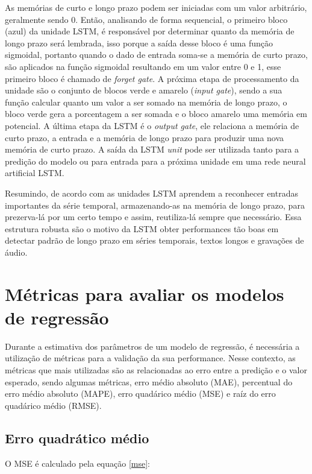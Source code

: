 \documentclass[
  12pt,		%
  a4paper,	%
  openright,%
  oneside,	%
  chapter=TITLE,		%
  section=TITLE,		%
  english,	%
  french,	%
  spanish,	%
  brazil	%
]{abntex2}
\begin{document}
    As memórias de curto e longo prazo podem ser iniciadas com um valor arbitrário, geralmente sendo 0. Então, analisando
    de forma sequencial, o primeiro bloco (azul) da unidade LSTM, é responsável por determinar quanto da memória de longo prazo será lembrada,
    isso porque a saída desse bloco é uma função sigmoidal, portanto quando o dado de entrada soma-se a memória de curto prazo, são aplicados
    na função sigmoidal resultando em um valor entre 0 e 1, esse primeiro bloco é chamado de \textit{forget gate}.
    A próxima etapa de processamento da unidade são o conjunto de blocos verde e amarelo (\textit{input gate}), sendo a sua função calcular 
    quanto um valor a ser somado na memória de longo prazo, o bloco verde gera a porcentagem a ser somada e o bloco amarelo
    uma memória em potencial.
    A última etapa da LSTM é o \textit{output gate}, ele relaciona a memória de curto prazo, a entrada e a memória de longo prazo
    para produzir uma nova memória de curto prazo. A saída da LSTM \textit{unit} pode ser utilizada tanto para a predição do modelo ou para entrada para a próxima unidade
    em uma rede neural artificial LSTM.

    Resumindo, de acordo com \cite[]{hands_on_ml} as unidades LSTM aprendem a reconhecer entradas importantes da série temporal, 
    armazenando-as na memória de longo prazo, para prezerva-lá por um certo tempo e assim, reutiliza-lá sempre que necessário. 
    Essa estrutura robusta são o motivo da LSTM obter performances tão boas em detectar padrão de longo prazo 
    em séries temporais, textos longos e gravações de áudio.


    \section{Métricas para avaliar os modelos de regressão}
    Durante a estimativa dos parâmetros de um modelo de regressão, é necessária a utilização de métricas
    para a validação da sua performance. Nesse contexto, as métricas que mais utilizadas são as relacionadas
    ao erro entre a predição e o valor esperado, sendo algumas métricas, erro médio absoluto (MAE), percentual do erro médio absoluto (MAPE), 
    erro quadárico médio (MSE) e raíz do erro quadárico médio (RMSE).

    \subsection{Erro quadrático médio}
    O MSE é calculado pela equação \ref*{mse}: 
\end{document}
